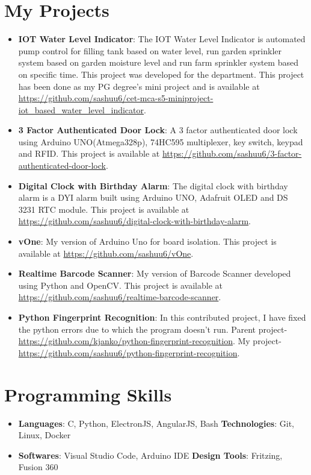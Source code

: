 \documentclass[letterpaper,11pt]{article}
\newcommand{\resumeItem}[2]{
	\item\small{
    		\textbf{#1}{: #2 \vspace{-2pt}}
  	}
}
\newcommand{\resumeSubItem}[2]{\resumeItem{#1}{#2}\vspace{-4pt}}
\newcommand{\resumeSubHeadingListStart}{\begin{itemize}[leftmargin=*]}
\newcommand{\resumeSubHeadingListEnd}{\end{itemize}}
\begin{document}
\section{My Projects}
  	\resumeSubHeadingListStart
		\resumeSubItem{IOT Water Level Indicator}
      			{ The IOT Water Level Indicator is automated pump control for filling tank based on water level, run garden sprinkler system based on garden moisture level and run farm sprinkler system based on specific time. This project was developed for the department. This project has been done as my PG degree's mini project and  is available at \url{https://github.com/sashuu6/cet-mca-s5-miniproject-iot_based_water_level_indicator}.}
    		\resumeSubItem{3 Factor Authenticated Door Lock}
      			{ A 3 factor authenticated door lock using Arduino UNO(Atmega328p), 74HC595 multiplexer, key switch, keypad and RFID. This project is available at \url{https://github.com/sashuu6/3-factor-authenticated-door-lock}.}
    		\resumeSubItem{Digital Clock with Birthday Alarm}
      			{The digital clock with birthday alarm is a DYI alarm built using Arduino UNO, Adafruit OLED and DS 3231 RTC module. This project is available at \url{https://github.com/sashuu6/digital-clock-with-birthday-alarm}.}
      		\resumeSubItem{vOne}
      			{My version of Arduino Uno for board isolation. This project is available at \url{https://github.com/sashuu6/vOne}.}
       		\resumeSubItem{Realtime Barcode Scanner}
      			{My version of Barcode Scanner developed using Python and OpenCV. This project is available at \url{https://github.com/sashuu6/realtime-barcode-scanner}.}
		\resumeSubItem{Python Fingerprint Recognition}
			{In this contributed project, I have fixed the python errors due to which the program doesn't run. Parent project-\url{https://github.com/kjanko/python-fingerprint-recognition}. My project-\url{https://github.com/sashuu6/python-fingerprint-recognition}.}
  	\resumeSubHeadingListEnd

  
\section{Programming Skills}
  	\resumeSubHeadingListStart
    		\item{
      			\textbf{Languages}{: C, Python, ElectronJS, AngularJS, Bash }
      			\hfill
      			\textbf{Technologies}{: Git, Linux, Docker}
    		}
		\item{
      			\textbf{Softwares}{: Visual Studio Code, Arduino IDE}
      			\hfill
      			\textbf{Design Tools}{: Fritzing, Fusion 360}
    		}
  	\resumeSubHeadingListEnd

\end{document}
